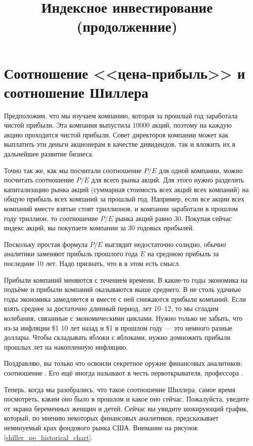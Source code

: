 
\title{Индексное инвестирование (продолженние)}



\section{Соотношение <<цена-прибыль>> и соотношение Шиллера}

Предположим, что мы изучаем компанию, которая за прошлый год заработала  чистой прибыли. Эта компания выпустила \num{10000} акций, поэтому на каждую акцию проходится  чистой прибыли. Совет директоров компании может как выплатить эти деньги акционерам в качестве дивидендов, так и вложить их в дальнейшее развитие бизнеса.

Точно так же, как мы посчитали соотношение $P/E$ для одной компании, можно посчитать соотношение $P/E$ для всего рынка акций. Для этого нужно разделить капитализацию рынка акций (суммарная стоимость всех акций всех компаний) на общую прибыль всех компаний за прошлый год. Например, если все акции всех компаний вместе взятые стоят  триллионов, и компании заработали в прошлом году  триллион, то соотношение $P/E$ рынка акций равно 30. Покупая сейчас индекс акций, вы покупаете компании за 30 годовых прибылей.

Поскольку простая формула $P/E$ выглядит недостаточно солидно, обычно аналитики заменяют прибыль прошлого года $E$ на среднюю прибыль за последние 10 лет. Надо признать, что в в этом есть смысл.

Прибыли компаний меняются с течением времени. В какие-то годы экономика на подъёме и прибыли компаний оказываются выше среднего. В не столь удачные годы экономика замедляется и вместе с ней снижаются прибыли компаний. Если взять среднее за достаточно длинный период, лет 10--12, то мы сгладим колебания, связанные с экономическими циклами. Нужно только не забыть, что из-за инфляции \$1 10 лет назад и \$1 в прошлом году --- это немного разные доллары. Чтобы складывать яблоки с яблоками, нужно домножить прибыли прошлых лет на накопленную инфляцию.

Поздравляю, вы только что освоили секретное оружие финансовых аналитиков: соотношение . Его ещё иногда называют  в честь первоткрывателя, профессора  \cite{campbell1988dividend}.

Теперь, когда мы разобрались, что такое соотношение Шиллера, самое время посмотреть, каким оно было в прошлом и какое оно сейчас. Пожалуйста, уведите от экрана беременных женщин и детей. Сейчас вы увидите шокирующий график, который, по мнению некоторых  финансовых аналитиков, предсказывает неминуемый крах фондового рынка США. Внимание на рисунок \ref{shiller_pe_historical_chart}.

